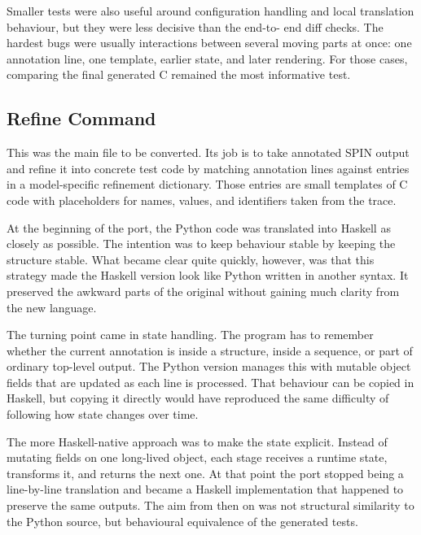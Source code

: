 Smaller tests were also useful around configuration handling and local
translation behaviour, but they were less decisive than the end-to-
end diff checks. The hardest bugs were usually interactions between
several moving parts at once: one annotation line, one template,
earlier state, and later rendering. For those cases, comparing the
final generated C remained the most informative test.

\subsection{Refine Command}


This was the main file to be converted. Its job is to take annotated
SPIN output and refine it into concrete test code by matching
annotation lines against entries in a model-specific refinement
dictionary. Those entries are small templates of C code with
placeholders for names, values, and identifiers taken from the trace.

At the beginning of the port, the Python code was translated into
Haskell as closely as possible. The intention was to keep behaviour
stable by keeping the structure stable. What became clear quite
quickly, however, was that this strategy made the Haskell version look
like Python written in another syntax. It preserved the awkward parts
of the original without gaining much clarity from the new language.

The turning point came in state handling. The program has to remember
whether the current annotation is inside a structure, inside a
sequence, or part of ordinary top-level output. The Python version
manages this with mutable object fields that are updated as each line
is processed. That behaviour can be copied in Haskell, but copying it
directly would have reproduced the same difficulty of following how
state changes over time.

The more Haskell-native approach was to make the state explicit.
Instead of mutating fields on one long-lived object, each stage
receives a runtime state, transforms it, and returns the next one. At
that point the port stopped being a line-by-line translation and
became a Haskell implementation that happened to preserve the same
outputs. The aim from then on was not structural similarity to the
Python source, but behavioural equivalence of the generated tests.

